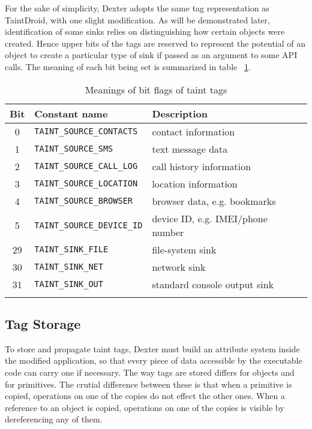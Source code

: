 \documentclass[12pt,twoside,notitlepage]{report}
\begin{document}
For the sake of simplicity, Dexter adopts the same tag representation as TaintDroid, with one slight modification. As will be demonstrated later, identification of some sinks relies on distinguishing how certain objects were created. Hence upper bits of the tags are reserved to represent the potential of an object to create a particular type of sink if passed as an argument to some API calls. The meaning of each bit being set is summarized in table ~\ref{table:TaintTagStorage_BitMeaning}.

\begin{table}
	\begin{center}
	\begin{tabular}{|c|l|l|}
		\firsthline
		\textbf{Bit} & \textbf{Constant name}        & \textbf{Description} \\
		\hline
		0            & \verb$TAINT_SOURCE_CONTACTS$  & contact information \\
		1            & \verb$TAINT_SOURCE_SMS$       & text message data \\
		2            & \verb$TAINT_SOURCE_CALL_LOG$  & call history information \\
		3            & \verb$TAINT_SOURCE_LOCATION$  & location information \\
		4            & \verb$TAINT_SOURCE_BROWSER$   & browser data, e.g. bookmarks \\
		5            & \verb$TAINT_SOURCE_DEVICE_ID$ & device ID, e.g. IMEI/phone number \\
		\hline
		29           & \verb$TAINT_SINK_FILE$        & file-system sink \\
		30           & \verb$TAINT_SINK_NET$         & network sink \\
		31           & \verb$TAINT_SINK_OUT$         & standard console output sink \\
		\lasthline
	\end{tabular}
	\end{center}
	\caption{Meanings of bit flags of taint tags}
	\label{table:TaintTagStorage_BitMeaning}
\end{table}

\subsection{Tag Storage}

To store and propagate taint tags, Dexter must build an attribute system inside the modified application, so that every piece of data accessible by the executable code can carry one if necessary. The way tags are stored differs for objects and for primitives. The crutial difference between these is that when a primitive is copied, operations on one of the copies do not effect the other ones. When a reference to an object is copied, operations on one of the copies is visible by dereferencing any of them.
\end{document}
